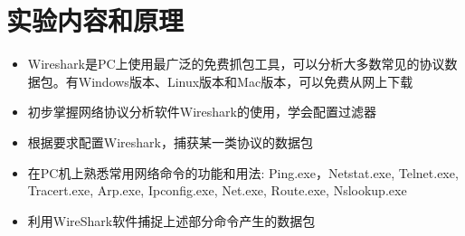 

\section{实验内容和原理}

\begin{itemize}
    \item Wireshark是PC上使用最广泛的免费抓包工具，可以分析大多数常见的协议数据包。有Windows版本、Linux版本和Mac版本，可以免费从网上下载 
    \item 初步掌握网络协议分析软件Wireshark的使用，学会配置过滤器
    \item 根据要求配置Wireshark，捕获某一类协议的数据包
    \item 在PC机上熟悉常用网络命令的功能和用法: Ping.exe，Netstat.exe, Telnet.exe, Tracert.exe, Arp.exe, Ipconfig.exe, Net.exe, Route.exe, Nslookup.exe
    \item 利用WireShark软件捕捉上述部分命令产生的数据包
\end{itemize}

